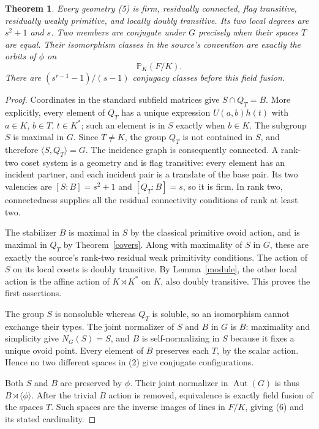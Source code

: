 \documentclass[11pt,a4paper]{article}
\newtheorem{theorem}{Theorem}
\newcommand{\gen}[1]{\langle #1\rangle}
\begin{document}
\begin{theorem}\label{geometries}
Every geometry (5) is firm, residually connected, flag transitive,
residually weakly primitive, and locally doubly transitive. Its two
local degrees are $s^2+1$ and $s$.
Two members are conjugate under $G$ precisely when their spaces $T$
are equal. Their isomorphism classes in the source's convention are
exactly the orbits of $\phi$ on
\[
                        \mathbb P_K(F/K).                 \tag{6}
\]
There are $(s^{r-1}-1)/(s-1)$ conjugacy classes before this field fusion.
\end{theorem}
\begin{proof}
Coordinates in the standard subfield matrices give
$S\cap Q_T=B$. More explicitly, every element of $Q_T$ has a unique
expression $U(a,b)h(t)$ with $a\in K$, $b\in T$, $t\in K^*$;
such an element is in $S$ exactly when $b\in K$.
The subgroup $S$ is maximal in $G$. Since $T\ne K$, the group $Q_T$
is not contained in $S$, and therefore $\gen{S,Q_T}=G$.
The incidence graph is consequently connected. A rank-two coset
system is a geometry and is flag transitive: every element has an
incident partner, and each incident pair is a translate of the base
pair. Its two valencies are $[S:B]=s^2+1$ and $[Q_T:B]=s$,
so it is firm. In rank two, connectedness supplies all the residual
connectivity conditions of rank at least two.

The stabilizer $B$ is maximal in $S$ by the classical primitive ovoid
action, and is maximal in $Q_T$ by Theorem~\ref{covers}. Along with
maximality of $S$ in $G$, these are exactly the source's rank-two
residual weak primitivity conditions. The action of $S$ on its local
cosets is doubly transitive. By Lemma~\ref{module}, the other local
action is the affine action of $K\rtimes K^*$ on $K$, also doubly
transitive. This proves the first assertions.

The group $S$ is nonsoluble whereas $Q_T$ is soluble, so an
isomorphism cannot exchange their types. The joint normalizer of
$S$ and $B$ in $G$ is $B$: maximality and simplicity give
$N_G(S)=S$, and $B$ is self-normalizing in $S$ because it fixes a
unique ovoid point. Every element of $B$ preserves each $T$, by
the scalar action. Hence no two different spaces in (2) give
conjugate configurations.

Both $S$ and $B$ are preserved by $\phi$. Their joint normalizer
in $\operatorname{Aut}(G)$ is thus $B\rtimes\gen{\phi}$.
After the trivial $B$ action is removed, equivalence is exactly
field fusion of the spaces $T$. Such spaces are the inverse images
of lines in $F/K$, giving (6) and its stated cardinality.
\end{proof}
\end{document}
